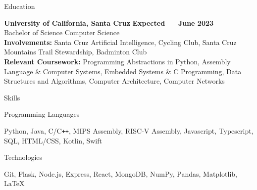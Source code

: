 \documentclass{resume}
\begin{document}
\begin{rSection}{\large Education}

{\bf University of California, Santa Cruz} \hfill {\bf{Expected --- June 2023}}
\\ Bachelor of Science Computer Science\hfill 
\\ \textbf{Involvements:}  Santa Cruz Artificial Intelligence, Cycling Club, Santa Cruz Mountains Trail Stewardship, Badminton Club
\\ \textbf{Relevant Coursework:} Programming Abstractions in Python, Assembly Language \& Computer Systems, Embedded Systems \& C Programming, Data Structures and Algorithms, Computer Architecture, Computer Networks

\end{rSection}

\begin{rSection}{\large Skills}
\begin{rSubsection}{Programming Languages}{}{}{}
\item Python, Java, C/C{}\verb!++!, MIPS Assembly, RISC-V Assembly, Javascript, Typescript, SQL, HTML/CSS, Kotlin, Swift
\end{rSubsection}

\begin{rSubsection}{Technologies}{}{}{}
\item Git, Flask, Node.js, Express, React, MongoDB, NumPy, Pandas, Matplotlib, LaTeX
\end{rSubsection}

\end{rSection}
\end{document}
